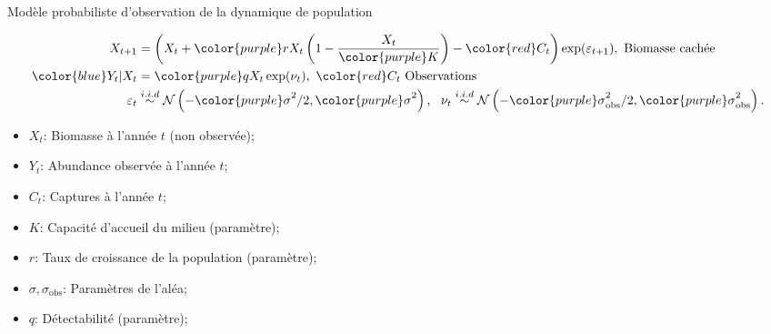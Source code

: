 \documentclass[ignorenonframetext,]{beamer}
\providecommand{\tightlist}{%
  \setlength{\itemsep}{0pt}\setlength{\parskip}{0pt}}
\begin{document}
\begin{frame}{Modèle probabiliste d'observation de la dynamique de
population}
\protect\hypertarget{moduxe8le-probabiliste-dobservation-de-la-dynamique-de-population}{}

\begin{align*}
X_{t+1} &= \left( X_t + {\color{purple}r} X_t\left(1- \frac{X_t}{\color{purple}K}\right) - {\color{red} C_t} \right) \exp(\varepsilon_{t + 1}), \text{ Biomasse cachée}\\
{\color{blue} Y_t}\vert X_t &= {\color{purple}q} X_t \exp(\nu_{t}),~ {\color{red} C_t} \text{ Observations}\\
\varepsilon_t& \overset{i.i.d}{\sim}\mathcal{N}\left(-{\color{purple} \sigma}^2 / 2, {\color{purple}\sigma}^2\right),~~\nu_t\overset{i.i.d}{\sim}\mathcal{N}\left(-{\color{purple}\sigma}_\text{obs}^2 / 2, {\color{purple} \sigma}_\text{obs}^2\right).
\end{align*}

\begin{itemize}
\tightlist
\item
  \(X_t\): Biomasse à l'année \(t\) (non observée);
\item
  \(Y_t\): Abundance observée à l'année \(t\);
\item
  \(C_t\): Captures à l'année \(t\);
\item
  \(K\): Capacité d'accueil du milieu (paramètre);
\item
  \(r\): Taux de croissance de la population (paramètre);
\item
  \(\sigma, \sigma_\text{obs}\): Paramètres de l'aléa;
\item
  \(q\): Détectabilité (paramètre);
\end{itemize}

\end{frame}
\end{document}
